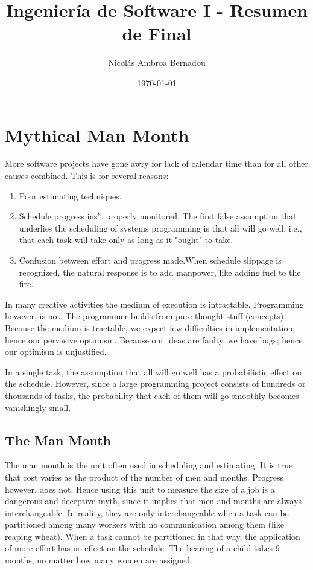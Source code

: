 \documentclass[letterpaper,12pt,parskip=full]{article}
\begin{document}
\title{Ingenier\'ia de Software I - Resumen de Final}
\author{Nicol\'as Ambroa Bernadou}
\date{\today}
\maketitle
\tableofcontents


\section{Mythical Man Month}

More software projects have gone awry for lack of calendar time than for all other causes combined. This is for several reasons:
\begin{enumerate}
    \item Poor estimating techniques.
    \item Schedule progress ins't properly monitored. The first false assumption that underlies the scheduling of systems programming is that all will go well, i.e., that each task will take only as long as it "ought" to take.
    \item Confusion between effort and progress made.When schedule slippage is recognized, the natural response is to add manpower, like adding fuel to the fire.
\end{enumerate}  

In many creative activities the medium of execution is intractable. Programming however, is not. The programmer builds from pure thought-stuff (concepts). Because the medium is tractable, we expect few difficulties in implementation; hence our pervasive optimism. Because our ideas are faulty, we have bugs; hence our optimism is unjustified.

In a single task, the assumption that all will go well has a probabilistic effect on the schedule. However, since a large programming project consists of hundreds or thousands of tasks, the probability that each of them will go smoothly becomes vanishingly small.
\subsection{The Man Month}
The man month is the unit often used in scheduling and estimating. It is true that cost varies as the product of the number of men and months. Progress however, does not. Hence using this unit to measure the size of a job is a dangerous and deceptive myth, since it implies that men and months are always interchangeable. In reality, they are only interchangeable when a task can be partitioned among many workers with no communication among them (like reaping wheat). When a task cannot be partitioned in that way, the application of more effort has no effect on the schedule. The bearing of a child takes 9 months, no matter how many women are assigned.
\end{document}
